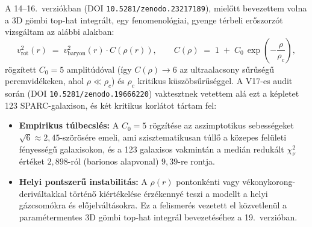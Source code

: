 \documentclass[10pt,a4paper]{article}
\begin{document}
\par
A 14--16.\ verzi\'okban (DOI \texttt{10.5281/zenodo.23217189}), miel\H{o}tt bevezettem volna a 3D g\"ombi top-hat integr\'alt, egy fenomenol\'ogiai, gyenge t\'erbeli er\H{o}szorz\'ot vizsg\'altam az al\'abbi alakban:
\begin{equation}
  v_{\text{rot}}^2(r) \;=\; v_{\text{baryon}}^2(r)\cdot C(\rho(r)), \qquad C(\rho) \;=\; 1 \;+\; C_0\,\exp\!\left(-\frac{\rho}{\rho_c}\right),
\end{equation}
r\"ogz\'itett $C_0 = 5$ amplit\'ud\'oval (\'igy $C(\rho)\to 6$ az ultraalacsony s\H{u}r\H{u}s\'eg\H{u} peremvid\'ekeken, ahol $\rho \ll \rho_c$) \'es $\rho_c$ kritikus k\"usz\"obs\H{u}r\H{u}s\'eggel. A V17-es audit sor\'an (DOI \texttt{10.5281/zenodo.19666220}) vaktesztnek vetettem al\'a ezt a k\'epletet 123 SPARC-galaxison, \'es k\'et kritikus korl\'atot t\'artam fel:
\begin{itemize}\setlength{\itemsep}{1.5pt}\setlength{\parskip}{0pt}\setlength{\topsep}{1pt}
  \item \textbf{Empirikus t\'ulbecsl\'es:} A $C_0=5$ r\"ogz\'it\'ese az aszimptotikus sebess\'egeket $\sqrt{6}\approx 2{,}45$-sz\"or\"os\'ere emeli, ami szisztematikusan t\'ull\H{o} a k\"ozepes fel\"uleti f\'enyess\'eg\H{u} galaxisokon, \'es a 123 galaxisos vakmint\'an a medi\'an reduk\'alt $\chi^2_\nu$ \'ert\'eket $2{,}898$-r\'ol (barionos alapvonal) $9{,}39$-re rontja.
  \item \textbf{Helyi pontszer\H{u} instabilit\'as:} A $\rho(r)$ pontonk\'enti vagy v\'ekonykorong-deriv\'altakkal t\"ort\'en\H{o} ki\'ert\'ekel\'ese \'erz\'ekenny\'e teszi a modellt a helyi g\'azcsom\'okra \'es el\H{o}jelv\'alt\'asokra. Ez a felismer\'es vezetett el k\"ozvetlen\"ul a param\'etermentes 3D g\"ombi top-hat integr\'al bevezet\'es\'ehez a 19.\ verzi\'oban.
\end{itemize}
\newpage
\end{document}
